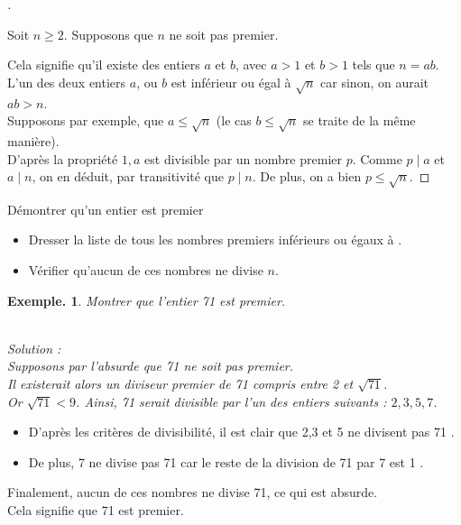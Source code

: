 \documentclass[12pt]{article}
\newcommand{\hide}[1]{\mbox{\vphantom{#1}\smash{\colorbox{gray!50}{\phantom{#1}}}}}
\theoremstyle{break}
\newtheorem*{example}{Exemple.}
\newenvironment{demo}[1][\proofname]{%
  \begin{proof}[#1]$ $\newline
}{%
  \end{proof}
}
\begin{document}
\begin{demo}
Soit $n \geqslant 2$. Supposons que $n$ ne soit pas premier.

Cela signifie qu'il existe des entiers $a$ et $b$, avec $a>1$ et $b>1$ tels que $n=a b$.
L'un des deux entiers $a$, ou $b$ est inférieur ou égal à $\sqrt{n}$ car sinon, on aurait $a b>n$.\\
Supposons par exemple, que $a \leqslant \sqrt{n}$ (le cas $b \leqslant \sqrt{n}$ se traite de la même manière).\\
D'après la propriété $1, a$ est divisible par un nombre premier $p$. Comme $p \mid a$ et $a \mid n$, on en déduit, par transitivité que $p \mid n$. De plus, on a bien $p \leqslant \sqrt{n}$.
\end{demo}

\begin{method}{Démontrer qu'un entier est premier}{}
\begin{itemize}[noitemsep,topsep=0pt]
  \item Dresser la liste de tous les nombres premiers inférieurs ou égaux à \hide{$\sqrt{n}$}.
  \item Vérifier qu'aucun de ces nombres ne divise $n$.
\end{itemize}
\end{method}

\begin{example}
Montrer que l'entier 71 est premier.

~\\Solution :\\
Supposons par l'absurde que 71 ne soit pas premier.\\
Il existerait alors un diviseur premier de 71 compris entre 2 et $\sqrt{71}$.\\
Or $\sqrt{71}<9$. Ainsi, 71 serait divisible par l'un des entiers suivants : $2,3,5,7$.
\end{example}

\begin{itemize}[noitemsep,topsep=0pt]
  \item D'après les critères de divisibilité, il est clair que 2,3 et 5 ne divisent pas 71 .
  \item De plus, 7 ne divise pas 71 car le reste de la division de 71 par 7 est 1 .
\end{itemize}

Finalement, aucun de ces nombres ne divise 71, ce qui est absurde.\\
Cela signifie que 71 est premier.
\end{document}
